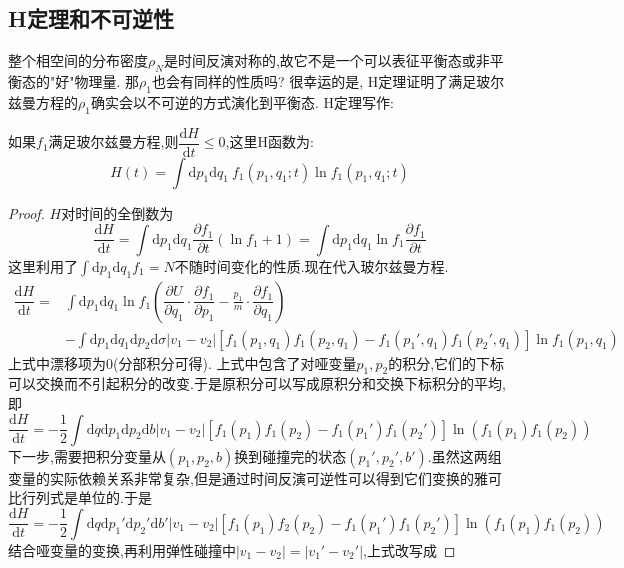 \subsection{H定理和不可逆性}
    整个相空间的分布密度$\rho_{N}$是时间反演对称的,故它不是一个可以表征平衡态或非平衡态的"好"物理量. 那$\rho_1$也会有同样的性质吗? 很幸运的是, H定理证明了满足玻尔兹曼方程的$\rho_1$确实会以不可逆的方式演化到平衡态.
    H定理写作:
    \begin{theorem}
      如果$f_1$满足玻尔兹曼方程,则$\dfrac{\mathrm{d}H}{\mathrm{d} t}\le 0$,这里H函数为:
      \begin{equation}
        H(t)=\int \mathrm{d} p_1 \mathrm{d} q_1 ~f_{1}(p_1,q_1;t)\ln f_1(p_1,q_1;t)
      \end{equation}
    \end{theorem}
    \begin{proof}
      $H$对时间的全倒数为
      \[\dfrac{\mathrm{d}H}{\mathrm{d} t}=\int \mathrm{d} p_1 \mathrm{d} q_1 \dfrac{\partial f_1}{\partial t}(\ln f_1 +1)=\int \mathrm{d} p_1 \mathrm{d} q_1 \ln f_1 \dfrac{\partial f_1}{\partial t}\]
      这里利用了$\int \mathrm{d} p_1 \mathrm{d} q_1 f_1=N$不随时间变化的性质.现在代入玻尔兹曼方程.
      \begin{align*}
        \dfrac{\mathrm{d}H}{\mathrm{d} t}=&\int \mathrm{d} p_1 \mathrm{d} q_1 \ln f_1 \left( \dfrac{\partial U}{\partial q_1}\cdot \dfrac{\partial f_1}{\partial p_1}-\frac{p_1}{m}\cdot \dfrac{\partial f_1}{\partial q_1} \right) \\
        &-\int \mathrm{d} p_1 \mathrm{d} q_1 \mathrm{d} p_2 \mathrm{d} \sigma \left\vert v_1-v_2 \right\vert \left[ f_1(p_1,q_1)f_1(p_2,q_1)-f_1(p_1',q_1)f_1(p_2',q_1) \right] \ln f_1 (p_1,q_1)
      \end{align*}
      上式中漂移项为0(分部积分可得). 上式中包含了对哑变量$p_1,p_2$的积分,它们的下标可以交换而不引起积分的改变.于是原积分可以写成原积分和交换下标积分的平均,即 
      \[\dfrac{\mathrm{d}H}{\mathrm{d} t}=-\frac{1}{2}\int \mathrm{d} q \mathrm{d} p_1 \mathrm{d} p_2 \mathrm{d} b \left\vert v_1-v_2 \right\vert \left[ f_1(p_1)f_1(p_2)-f_1(p_1')f_1(p_2') \right]\ln\left( f_1(p_1)f_1(p_2) \right) \]
      下一步,需要把积分变量从$(p_1,p_2,b)$换到碰撞完的状态$(p_1',p_2',b')$.虽然这两组变量的实际依赖关系非常复杂,但是通过时间反演可逆性可以得到它们变换的雅可比行列式是单位的.于是 
      \[\dfrac{\mathrm{d}H}{\mathrm{d} t}=-\frac{1}{2}\int \mathrm{d} q \mathrm{d} p_1' \mathrm{d}  p_2' \mathrm{d} b' \left\vert v_1- v_2 \right\vert \left[ f_1(p_1)f_2(p_2)-f_1(p_1')f_1(p_2') \right] \ln(f_1(p_1)f_1(p_2)) \]
      结合哑变量的变换,再利用弹性碰撞中$\left\vert v_1-v_2 \right\vert =\left\vert v_1'-v_2' \right\vert $,上式改写成

\end{proof}
